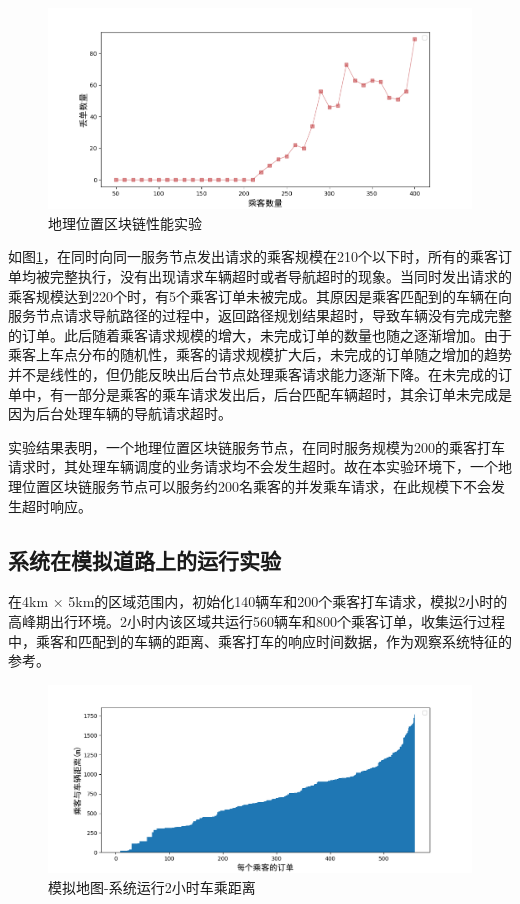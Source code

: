\begin{figure}[h]
  \centering
  \includegraphics[width=1.0\textwidth]{figures/地理位置区块链性能实验}
  \caption{地理位置区块链性能实验}\label{fig:treeBlockchcainPerformance}
\end{figure}

如图\ref{fig:treeBlockchcainPerformance}，在同时向同一服务节点发出请求的乘客规模在210个以下时，所有的乘客订单均被完整执行，没有出现请求车辆超时或者导航超时的现象。当同时发出请求的乘客规模达到220个时，有5个乘客订单未被完成。其原因是乘客匹配到的车辆在向服务节点请求导航路径的过程中，返回路径规划结果超时，导致车辆没有完成完整的订单。此后随着乘客请求规模的增大，未完成订单的数量也随之逐渐增加。由于乘客上车点分布的随机性，乘客的请求规模扩大后，未完成的订单随之增加的趋势并不是线性的，但仍能反映出后台节点处理乘客请求能力逐渐下降。在未完成的订单中，有一部分是乘客的乘车请求发出后，后台匹配车辆超时，其余订单未完成是因为后台处理车辆的导航请求超时。

实验结果表明，一个地理位置区块链服务节点，在同时服务规模为200的乘客打车请求时，其处理车辆调度的业务请求均不会发生超时。故在本实验环境下，一个地理位置区块链服务节点可以服务约200名乘客的并发乘车请求，在此规模下不会发生超时响应。

\subsection{系统在模拟道路上的运行实验}
在4km × 5km的区域范围内，初始化140辆车和200个乘客打车请求，模拟2小时的高峰期出行环境。2小时内该区域共运行560辆车和800个乘客订单，收集运行过程中，乘客和匹配到的车辆的距离、乘客打车的响应时间数据，作为观察系统特征的参考。

\begin{figure}[h]
  \centering
  \includegraphics[width=1.0\textwidth]{figures/2hDistance}
  \caption{模拟地图-系统运行2小时车乘距离}\label{fig:2hDistance}
\end{figure}

